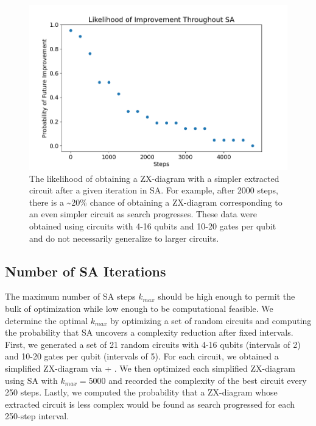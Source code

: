\begin{figure}[t]
\centering
\includegraphics[width=13cm]{img/iter-likelihood.png}
\caption{
  The likelihood of obtaining a ZX-diagram with a simpler extracted circuit after a given iteration in SA.
  For example, after 2000 steps, there is a \textasciitilde 20\% chance of obtaining a ZX-diagram corresponding to an even simpler circuit as search progresses.
  These data were obtained using circuits with 4-16 qubits and 10-20 gates per qubit and do not necessarily generalize to larger circuits.
}
\label{fig:iter-likelihood}
\end{figure}

\subsection*{Number of SA Iterations}

The maximum number of SA steps $k_{max}$ should be high enough to permit the bulk of optimization while low enough to be computational feasible.
We determine the optimal $k_{max}$ by optimizing a set of random circuits and computing the probability that SA uncovers a complexity reduction after fixed intervals.
First, we generated a set of 21 random circuits with 4-16 qubits (intervals of 2) and 10-20 gates per qubit (intervals of 5).
For each circuit, we obtained a simplified ZX-diagram via  + .
We then optimized each simplified ZX-diagram using SA with $k_{max} = 5000$ and recorded the complexity of the best circuit every 250 steps.
Lastly, we computed the probability that a ZX-diagram whose extracted circuit is less complex would be found as search progressed for each 250-step interval.

